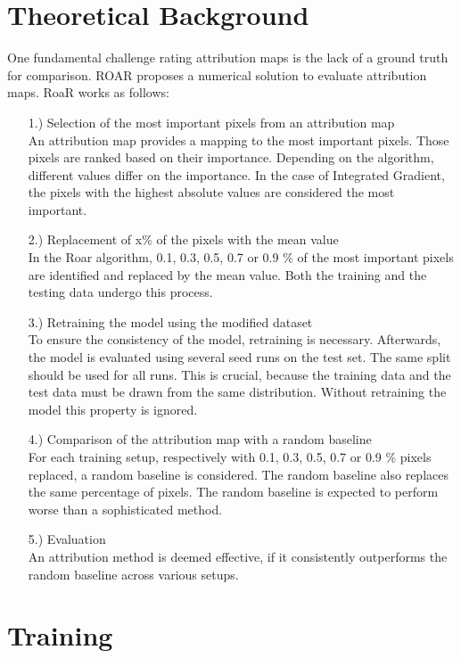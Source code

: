 \documentclass[conference]{IEEEtran}
\begin{document}
\section{Theoretical Background}
One fundamental challenge rating attribution maps is the lack of a ground truth for comparison. ROAR proposes a numerical solution to evaluate attribution maps. 
RoaR \cite{8_RoaR} works as follows:
\begin{enumerate}
	\item[1.)] Selection of the most important pixels from an attribution map\\
	An attribution map provides a mapping to the most important pixels. Those pixels are ranked based on their importance. Depending on the algorithm, different values differ on the importance. In the case of Integrated Gradient, the pixels with the highest absolute values are considered the most important.
	\item[2.)] Replacement of x\% of the pixels with the mean value\\
	In the Roar algorithm, 0.1, 0.3, 0.5, 0.7 or 0.9 \% of the most important pixels are identified and replaced by the mean value. Both the training and the testing data undergo this process.
	\item[3.)] Retraining the model using the modified dataset\\
	To ensure the consistency of the model, retraining is necessary. Afterwards, the model is evaluated using several seed runs on the test set. The same split should be used for all runs.
	This is crucial, because the training data and the test data must be drawn from the same distribution. Without retraining the model this property is ignored.
	\item[4.)] Comparison of the attribution map with a random baseline \\
	For each training setup, respectively with 0.1, 0.3, 0.5, 0.7 or 0.9 \% pixels replaced, a random baseline is considered. The random baseline also replaces the same percentage of pixels. The random baseline is expected to perform worse than a sophisticated method.
	\item[5.)] Evaluation \\
	An attribution method is deemed effective, if it consistently outperforms the random baseline across various setups.
\end{enumerate}


\section{Training}
\end{document}
